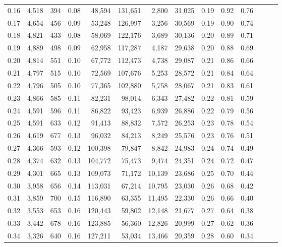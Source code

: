 \begin{tabular}{rrrrrrrrrrrrrr}
0.16 &  4,518 &  394 &  0.08 &   48,594 &  131,651 &   2,800 &  31,025 &  0.19 &  0.92 &      0.76 \\
0.17 &  4,654 &  456 &  0.09 &   53,248 &  126,997 &   3,256 &  30,569 &  0.19 &  0.90 &      0.74 \\
0.18 &  4,821 &  433 &  0.08 &   58,069 &  122,176 &   3,689 &  30,136 &  0.20 &  0.89 &      0.71 \\
0.19 &  4,889 &  498 &  0.09 &   62,958 &  117,287 &   4,187 &  29,638 &  0.20 &  0.88 &      0.69 \\
0.20 &  4,814 &  551 &  0.10 &   67,772 &  112,473 &   4,738 &  29,087 &  0.21 &  0.86 &      0.66 \\
0.21 &  4,797 &  515 &  0.10 &   72,569 &  107,676 &   5,253 &  28,572 &  0.21 &  0.84 &      0.64 \\
0.22 &  4,796 &  505 &  0.10 &   77,365 &  102,880 &   5,758 &  28,067 &  0.21 &  0.83 &      0.61 \\
0.23 &  4,866 &  585 &  0.11 &   82,231 &   98,014 &   6,343 &  27,482 &  0.22 &  0.81 &      0.59 \\
0.24 &  4,591 &  596 &  0.11 &   86,822 &   93,423 &   6,939 &  26,886 &  0.22 &  0.79 &      0.56 \\
0.25 &  4,591 &  633 &  0.12 &   91,413 &   88,832 &   7,572 &  26,253 &  0.23 &  0.78 &      0.54 \\
0.26 &  4,619 &  677 &  0.13 &   96,032 &   84,213 &   8,249 &  25,576 &  0.23 &  0.76 &      0.51 \\
0.27 &  4,366 &  593 &  0.12 &  100,398 &   79,847 &   8,842 &  24,983 &  0.24 &  0.74 &      0.49 \\
0.28 &  4,374 &  632 &  0.13 &  104,772 &   75,473 &   9,474 &  24,351 &  0.24 &  0.72 &      0.47 \\
0.29 &  4,301 &  665 &  0.13 &  109,073 &   71,172 &  10,139 &  23,686 &  0.25 &  0.70 &      0.44 \\
0.30 &  3,958 &  656 &  0.14 &  113,031 &   67,214 &  10,795 &  23,030 &  0.26 &  0.68 &      0.42 \\
0.31 &  3,859 &  700 &  0.15 &  116,890 &   63,355 &  11,495 &  22,330 &  0.26 &  0.66 &      0.40 \\
0.32 &  3,553 &  653 &  0.16 &  120,443 &   59,802 &  12,148 &  21,677 &  0.27 &  0.64 &      0.38 \\
0.33 &  3,442 &  678 &  0.16 &  123,885 &   56,360 &  12,826 &  20,999 &  0.27 &  0.62 &      0.36 \\
0.34 &  3,326 &  640 &  0.16 &  127,211 &   53,034 &  13,466 &  20,359 &  0.28 &  0.60 &      0.34 \\

\end{tabular}
